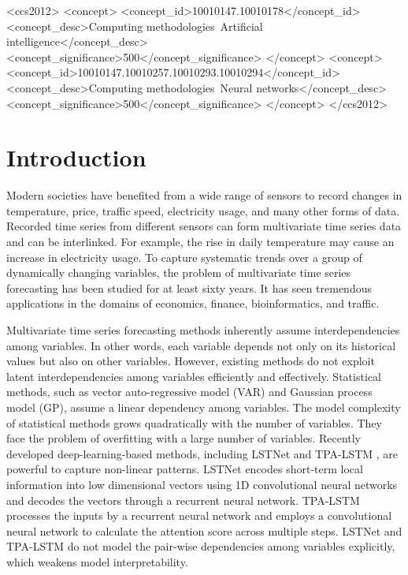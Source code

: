 \documentclass[sigconf]{acmart}
\begin{document}
\begin{CCSXML}
<ccs2012>
<concept>
<concept_id>10010147.10010178</concept_id>
<concept_desc>Computing methodologies~Artificial intelligence</concept_desc>
<concept_significance>500</concept_significance>
</concept>
<concept>
<concept_id>10010147.10010257.10010293.10010294</concept_id>
<concept_desc>Computing methodologies~Neural networks</concept_desc>
<concept_significance>500</concept_significance>
</concept>
</ccs2012>
\end{CCSXML}



 

\maketitle



\section{Introduction}
Modern societies have benefited from a wide range of sensors to record changes in temperature, price, traffic speed, electricity usage, and many other forms of data. Recorded time series from different sensors can form multivariate time series data and can be interlinked. For example, the rise in daily temperature may cause an increase in electricity usage. To capture systematic trends over a group of dynamically changing variables, the problem of multivariate time series forecasting has been studied for at least sixty years. It has seen tremendous applications in the domains of economics, finance, bioinformatics, and traffic. 


Multivariate time series forecasting methods inherently assume interdependencies among variables. In other words, each variable depends not only on its historical values but also on other variables. However, existing methods do not exploit latent interdependencies among variables efficiently and effectively. Statistical methods, such as vector auto-regressive model (VAR) and Gaussian process model (GP), assume a linear dependency among variables. The model complexity of statistical methods grows quadratically with the number of variables. They face the problem of overfitting with a large number of variables. Recently developed deep-learning-based methods, including LSTNet \cite{lai2018modeling} and TPA-LSTM \cite{shih2019temporal}, are powerful to capture non-linear patterns. LSTNet encodes short-term local information into low dimensional vectors using 1D convolutional neural networks and decodes the vectors through a recurrent neural network. TPA-LSTM processes the inputs by a recurrent neural network and employs a convolutional neural network to calculate the attention score across multiple steps. LSTNet and TPA-LSTM do not model the pair-wise dependencies among variables explicitly, which weakens model interpretability. 
\end{document}
